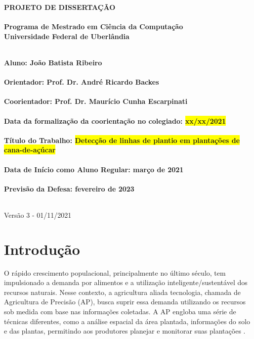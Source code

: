 \documentclass[12pt, a4paper, english, brazil]{article}
\newcommand{\textRed}[1]{{{\color{red} #1}}}
\begin{document}
\rhead{\thepage}

\begin{center}
	\bf{\LARGE{PROJETO DE DISSERTAÇÃO}\\ $\ $\\}
	\Large{Programa de Mestrado em Ciência da Computação\\
		Universidade Federal de Uberlândia}\\ $\ $\\
\end{center}

\begin{center}
	\bf{Aluno: João Batista Ribeiro\\ $\ $\\
		Orientador: Prof. Dr. André Ricardo Backes\\ $\ $\\
		Coorientador: Prof. Dr. Maurício Cunha Escarpinati\\ $\ $\\
		Data da formalização da coorientação no colegiado: \colorbox{yellow}{xx/xx/2021}\\ $\ $\\
		Título do Trabalho: \colorbox{yellow}{Detecção de linhas de plantio em plantações de cana-de-açúcar}\\ $\ $\\
		Data de Início como Aluno Regular: março de 2021\\ $\ $\\
		Previsão da Defesa: fevereiro de 2023\\ $\ $\\}
\end{center}

\textRed{Versão 3 - 01/11/2021}

\section{Introdução}

O rápido crescimento populacional, principalmente no último século, tem impulsionado a demanda por alimentos e a utilização inteligente/sustentável dos recursos naturais. Nesse contexto, a agricultura aliada tecnologia, chamada de Agricultura de Precisão (AP), busca suprir essa demanda utilizando os recursos sob medida com base nas informações coletadas. A AP engloba uma série de técnicas diferentes, como a análise espacial da área plantada, informações do solo e das plantas, permitindo aos produtores planejar e monitorar suas plantações \cite{Blasch_2020}.
\end{document}
